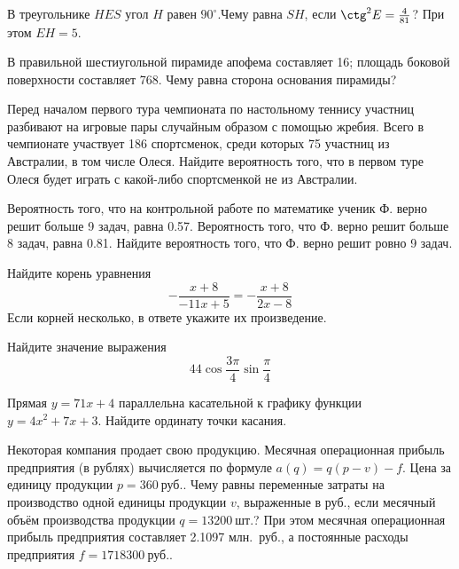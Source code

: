 \documentclass[twocolumn]{article}
\begin{document}
\begin{taskBN}{1}
В треугольнике $HES$ угол $H$ равен $90^\circ$.Чему равна  $SH$, если $\ctg^2{E}=\frac{4}{81}$? При этом  $EH=5$. 
\end{taskBN}

\begin{taskBN}{2}
В правильной шестиугольной пирамиде апофема составляет 16; площадь боковой поверхности составляет 768. Чему равна сторона основания пирамиды?\vspace{2.5cm}
\end{taskBN}

\begin{taskBN}{3}
Перед началом первого тура чемпионата по настольному теннису участниц разбивают на игровые пары случайным образом с помощью жребия. Всего в чемпионате участвует 186 спортсменок, среди которых 75 участниц из Австралии, в том числе Олеся. Найдите вероятность того, что в первом туре Олеся будет играть с какой-либо спортсменкой не из Австралии.
\end{taskBN}

\begin{taskBN}{4}
Вероятность того, что на контрольной работе по математике ученик Ф. верно решит больше 9 задач, равна 0.57. Вероятность того, что Ф. верно решит больше 8 задач, равна 0.81. Найдите вероятность того, что Ф. верно решит ровно 9 задач.
\end{taskBN}

\begin{taskBN}{5}
Найдите корень уравнения $$-\frac{x+8}{-11x+5}=-\frac{x+8}{2x-8}$$ Если корней несколько, в ответе укажите их произведение.
\end{taskBN}

\begin{taskBN}{6}
Найдите значение выражения $$44\cos\frac{3\pi}{4}\sin\frac{\pi}{4}$$
\end{taskBN}

\begin{taskBN}{7}
Прямая $y=71x+4$ параллельна касательной к графику функции $y=4x^{2}+7x+3$. Найдите ординату точки касания.
\end{taskBN}

\begin{taskBN}{8}
Некоторая компания продает свою продукцию. Месячная операционная прибыль предприятия (в рублях) вычисляется по формуле $a(q)=q(p-v)-f$. Цена за единицу продукции $p=360~\mbox{руб}.$. Чему равны переменные затраты на производство одной единицы продукции $v$, выраженные в \mbox{руб}., если месячный объём производства продукции $q=13200~\mbox{шт}.$? При этом месячная операционная прибыль предприятия составляет 2.1097 \mbox{млн. руб}., а постоянные расходы предприятия $f=1718300~\mbox{руб}.$. 
\end{taskBN}
\end{document}
